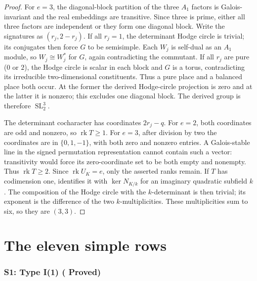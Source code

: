 \documentclass[11pt,reqno]{article}
\theoremstyle{emphasizedplain}
\DeclareRobustCommand{\provedstatus}{%
  \texorpdfstring{\textcolor{ProvedGreen}{\textbf{Proved}}}{Proved}}
\theoremstyle{emphasizeddefinition}
\theoremstyle{emphasizeddefinition}
\DeclareMathOperator{\SL}{SL}
\DeclareMathOperator{\rk}{rk}
\begin{document}
\begin{proof}
For $e=3$, the diagonal-block partition of the three $A_1$ factors is
Galois-invariant and the real embeddings are transitive. Since three
is prime, either all three factors are independent or they form one
diagonal block. Write the signatures as $(r_j,2-r_j)$.
If all $r_j=1$, the determinant Hodge circle is trivial; its conjugates
then force $G$ to be semisimple. Each $W_j$ is self-dual as an $A_1$
module, so $W_j\cong W_j^*$ for $G$, again contradicting the commutant.
If all $r_j$ are pure ($0$ or $2$), the Hodge circle is scalar in each
block and $G$ is a torus, contradicting its irreducible two-dimensional
constituents. Thus a pure place and a balanced place both occur.
At the former the derived Hodge-circle projection is zero and at the
latter it is nonzero; this excludes one diagonal block. The derived
group is therefore $\SL_2^3$.

The determinant cocharacter has coordinates $2r_j-q$.
For $e=2$, both coordinates are odd and nonzero, so $\rk T\geq1$.
For $e=3$, after division by two the coordinates are in $\{0,1,-1\}$,
with both zero and nonzero entries. A Galois-stable line in the signed
permutation representation cannot contain such a vector: transitivity
would force its zero-coordinate set to be both empty and nonempty.
Thus $\rk T\geq2$. Since $\rk U_K=e$, only the asserted ranks remain.
If $T$ has codimension one, \cite[Lemma (3.7)]{MZ} identifies it with
$\ker N_{K/k}$ for an imaginary quadratic subfield $k$.
The composition of the Hodge circle with the $k$-determinant is then
trivial; its exponent is the difference of the two $k$-multiplicities.
These multiplicities sum to six, so they are $(3,3)$.
\end{proof}

\part{The eleven simple rows}
\section{S1: Type I(1) (\provedstatus)}\label{sec:S1}
\end{document}
